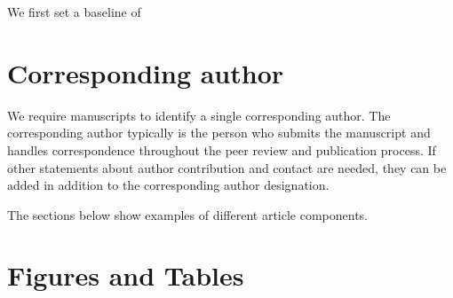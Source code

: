 \documentclass[9pt,twocolumn,twoside]{opticajnl}
\begin{document}
We first set a baseline of 

\section{Corresponding author}

We require manuscripts to identify a single corresponding author. The corresponding author typically is the person who submits the manuscript and handles correspondence throughout the peer review and publication process. If other statements about author contribution and contact are needed, they can be added in addition to the corresponding author designation.









The sections below show examples of different article components.

\section{Figures and Tables}
\end{document}

